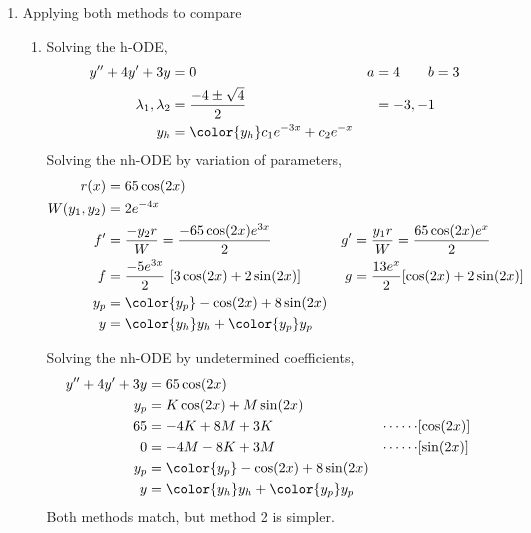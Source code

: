 \begin{enumerate}
    \item Applying both methods to compare
          \begin{enumerate}
              \item Solving the h-ODE,
                    \begin{align}
                        y''  + 4y' + 3y          & = 0                                        & a & = 4 \qquad b = 3 \\
                        \lambda_{1}, \lambda_{2} & = \frac{-4 \pm \sqrt{4}}{2}                &   & = -3, -1         \\
                        y_{h}                    & = {\color{y_h} c_{1}e^{-3x} + c_{2}e^{-x}}
                    \end{align}
                    Solving the nh-ODE by variation of parameters,
                    \begin{align}
                        r(x)            & = 65\cos(2x)                                                                                            \\
                        W(y_{1}, y_{2}) & = 2e^{-4x}                                                                                              \\
                        f'              & = \frac{-y_{2}r}{W} = \frac{-65\cos(2x)e^{3x}}{2} & g' & = \frac{y_{1}r}{W} = \frac{65\cos(2x)e^{x}}{2} \\
                        f               & = \frac{-5e^{3x}}{2}\ [3\cos(2x) + 2\sin(2x)]     & g  & = \frac{13e^{x}}{2} [\cos(2x) + 2\sin(2x)]     \\
                        y_{p}           & = {\color{y_p} -\cos(2x) + 8\sin(2x)}                                                                   \\
                        y               & = {\color{y_h} y_{h}} + {\color{y_p} y_{p}}
                    \end{align}

                    Solving the nh-ODE by undetermined coefficients,
                    \begin{align}
                        y'' + 4y' + 3y & = 65\cos(2x)                                                            \\
                        y_{p}          & = K\cos(2x) + M\sin(2x)                                                 \\
                        65             & =  -4K + 8M + 3K                            & \cdots\cdots & [\cos(2x)] \\
                        0              & =  -4M - 8K + 3M                            & \cdots\cdots & [\sin(2x)] \\
                        y_{p}          & = {\color{y_p} -\cos(2x) + 8\sin(2x)}                                   \\
                        y              & = {\color{y_h} y_{h}} + {\color{y_p} y_{p}}
                    \end{align}
                    Both methods match, but method 2 is simpler.


\end{enumerate}
\end{enumerate}
